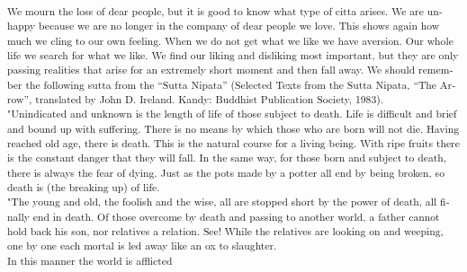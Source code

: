 \textsuperscript{\textenglish[variant=american]{We mourn the loss of
dear people, but it is good to know what type of citta arises. We are
unhappy because we are no longer in the company of dear
}\textdutch{people}\textenglish[variant=american]{ we
}\textdutch{love}\textenglish[variant=american]{. This shows again how
much we cling to our own feeling. When we do not get what we like we
have aversion. Our whole life we search for what we like. }\textdutch{We
find o}\textenglish[variant=american]{ur liking and
disliking}\textdutch{ most important, but they are only passing
realities that arise for an extremely short moment and then fall away.
We should remember the following sutta from
}\textdutch{t}\textenglish[variant=american]{he }\textdutch{``}Sutta
Nipata\textdutch{'' (}\textitalian{Selected Texts from the Sutta Nipata,
}\textdutch{``The Arrow'', }\textenglish[variant=american]{translated by
John D. Ireland}\textdutch{. }\textenglish[variant=american]{Kandy:
Buddhist Publication Society, 1983)}\textdutch{.}{{\\
}}\textenglish[variant=american]{"Unindicated and unknown is the length
of life of those subject to death. Life}\textdutch{
}\textenglish[variant=american]{is difficult and brief and bound up with
suffering. There is no means by which}\textdutch{
}\textenglish[variant=american]{those who are born will not die. Having
reached old age, there is death. This is}\textdutch{
}\textenglish[variant=american]{the natural course for a living being.
With ripe fruits there is the constant}\textdutch{
}\textenglish[variant=american]{danger that they will fall. In the same
way, for those born and subject to}\textdutch{
}\textenglish[variant=american]{death, there is always the fear of
dying. Just as the pots made by a potter all}\textdutch{
}\textenglish[variant=american]{end by being broken, so death is (the
breaking up) of life.}{{\\
}}\textenglish[variant=american]{"The young and old, the foolish and the
wise, all are stopped short by the power}\textdutch{
}\textenglish[variant=american]{of death, all finally end in death. Of
those overcome by death and passing to}\textdutch{
}\textenglish[variant=american]{another world, a father cannot hold back
his son, nor relatives a relation. See!}\textdutch{
}\textenglish[variant=american]{While the relatives are looking on and
weeping, one by one each mortal is led}\textdutch{
}\textenglish[variant=american]{away like an ox to slaughter.}{{\\
}}\textenglish[variant=american]{In this manner the world is afflicted
}}
